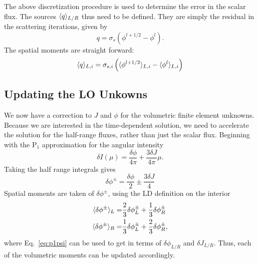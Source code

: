 The above discretization procedure is used to determine the error in the scalar flux.
The sources $\langle q \rangle_{L/R}$ thus need to be defined.  They are simply the residual in
the scattering iterations, given by
\begin{equation}
    q = \sigma_s\left(\phi^{l+1/2} - \phi^{l}\right).
\end{equation}
The spatial moments are straight forward:
\begin{equation}
    \langle q \rangle_{L,i} = \sigma_{s,i}\left(\langle \phi^{l+1/2} \rangle_{L,i} -
    \langle \phi^{l} \rangle_{L,i}\right)
\end{equation}

\subsection{Updating the LO Unkowns}

We now have a correction to $J$ and $\phi$ for the volumetric finite element
unknowns.
Because we are interested in the time-dependent solution, we need to accelerate the solution for the
half-range fluxes, rather than just the scalar flux. Beginning with the P$_1$
approximation for the angular intensity
\begin{equation}
 \delta I(\mu) = \frac{\delta\phi}{4\pi} + \frac{3\delta J}{4\pi} \mu.
\end{equation}
Taking the half range integrals gives
\begin{equation}\label{eq:p1psi}
    \delta \phi^{\pm} = \frac{\delta \phi}{2} \pm \frac{3 \delta J}{4}
\end{equation}
Spatial moments are taken of $\delta \phi^{\pm}$, using the LD definition on the interior
\begin{align}
    \langle \delta \phi^{\pm} \rangle_L =&  \frac{2}{3}\delta \phi^{\pm}_{L} + \frac{1}{3}\delta \phi^{\pm}_{R}  \\
    \langle \delta \phi^{\pm} \rangle_R =&  \frac{1}{3}\delta \phi^{\pm}_{L} + \frac{2}{3}\delta \phi^{\pm}_{R}      ,
\end{align}
where Eq.~\eqref{eq:p1psi} can be used to get in terms of $\delta \phi_{L/R}$ and $\delta J_{L/R}$.
Thus, each of the volumetric moments can be updated accordingly.








